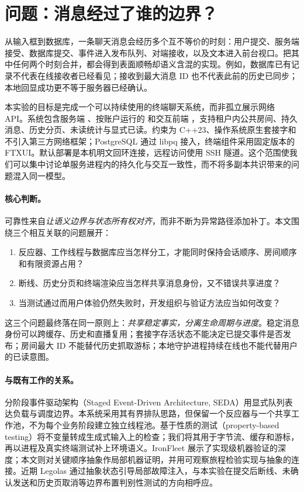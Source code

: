 \section{问题：消息经过了谁的边界？}
\label{sec:intro}
从输入框到数据库，一条聊天消息会经历多个互不等价的时刻：用户提交、服务端接受、数据库提交、事件进入发布队列、对端接收，以及文本进入前台视口。把其中任何两个时刻合并，都会得到表面顺畅却语义含混的实现。例如，数据库已有记录不代表在线接收者已经看见；接收到最大消息 ID 也不代表此前的历史已同步；本地回显成功更不等于服务器已经确认。

本实验的目标是完成一个可以持续使用的终端聊天系统，而非孤立展示网络 API。系统包含服务端 、按账户运行的  和交互前端 ，支持租户内公共房间、持久消息、历史分页、未读统计与显式已读。约束为 C++23、操作系统原生套接字和不引入第三方网络框架；PostgreSQL 通过 libpq 接入，终端组件采用固定版本的 FTXUI。默认部署是本机明文回环连接，远程访问使用 SSH 隧道。这个范围使我们可以集中讨论单服务进程内的持久化与交互一致性，而不将多副本共识带来的问题混入同一模型。

\paragraph{核心判断。}
可靠性来自\emph{让语义边界与状态所有权对齐}，而非不断为异常路径添加补丁。本文围绕三个相互关联的问题展开：
\begin{enumerate}[leftmargin=*,nosep]
\item 反应器、工作线程与数据库应当怎样分工，才能同时保持会话顺序、房间顺序和有限资源占用？
\item 断线、历史分页和终端渲染应当怎样共享消息身份，又不错误共享进度？
\item 当测试通过而用户体验仍然失败时，开发组织与验证方法应当如何改变？
\end{enumerate}

这三个问题最终落在同一原则上：\emph{共享稳定事实，分离生命周期与进度}。稳定消息身份可以跨缓存、历史和直播复用；套接字存活状态不能决定已提交事件是否发布；房间最大 ID 不能替代历史抓取游标；本地守护进程持续在线也不能代替用户的已读意图。

\paragraph{与既有工作的关系。}
分阶段事件驱动架构（Staged Event-Driven Architecture, SEDA）用显式队列表达负载与调度边界\cite{seda}。本系统采用其有界排队思路，但保留一个反应器与一个共享工作池，不为每个业务阶段建立独立线程池。基于性质的测试（property-based testing）将不变量转成生成式输入上的检查\cite{quickcheck}；我们将其用于字节流、缓存和游标，再以进程及真实终端测试补上环境语义。IronFleet 展示了实现级机器验证的深度\cite{ironfleet}；本文则对关键顺序抽象作局部机器证明，并用可观察旅程检验实现与抽象的连接。近期 Legolas 通过抽象状态引导局部故障注入\cite{legolas}，与本实验在提交后断线、未确认发送和历史页取消等边界布置判别性测试的方向相呼应。

